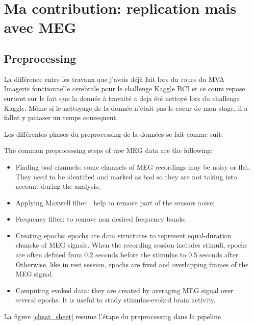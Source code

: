 \chapter{Ma contribution: replication mais avec MEG}



\section{Preprocessing}

La différence entre les travaux que j'avais déjà fait lors du cours du MVA Imagerie fonctionnelle cerebrale pour le challenge Kaggle BCI et ce cours repose surtout sur le fait que la donnée à travaité a deja été nettoyé lors du challenge Kaggle. Même si le nettoyage de la donnée n'était pas le coeur de mon stage, il a fallut y poaaser un temps consequent.

Les différentes phases du preprocessing de la données se fait comme suit:


The common preprocessing steps of raw MEG data are the following:
\begin{itemize}
    \item Finding bad channels: some channels of MEG recordings may be noisy or flat. They need to be identified and marked as bad so they are not taking into account during the analysis;
    \item Applying Maxwell filter : help to remove part of the sensors noise;
    \item Frequency filter: to remove non desired frequency bands;
    \item Creating epochs: epochs are data structures to represent equal-duration chuncks of MEG
          signals. When the recording session includes stimuli, epochs are often defined from 0.2 seconds
          before the stimulus to 0.5 seconds after. Otherwise, like in rest session, epochs are fixed and
          overlapping frames of the MEG signal.
    \item Computing evoked data: they are created by averaging MEG signal over several epochs. It is useful to study stimulus-evoked brain activity.
\end{itemize}


La figure \ref{cheat_sheet} resume l'étape du preprocessing dans la pipeline

